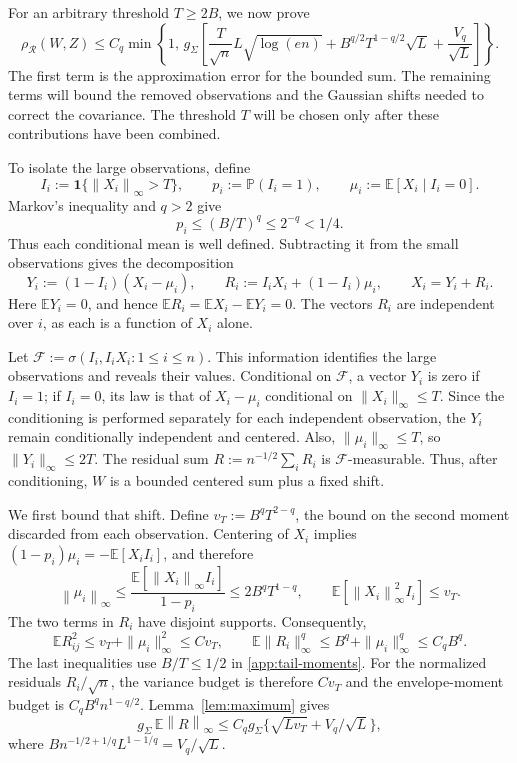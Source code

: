 \documentclass[11pt,letterpaper]{article}
\theoremstyle{remark}
\newcommand{\E}{\mathbb E}
\newcommand{\Pp}{\mathbb P}
\newcommand{\norm}[1]{\left\lVert#1\right\rVert}
\newcommand{\rh}{\rho_{\mathcal R}}
\newcommand{\ind}{\mathbf 1}
\begin{document}
For an arbitrary threshold $T\ge2B$, we now prove
\begin{equation}
 \rh(W,Z)\le C_q\min\left\{1,\,
 g_\Sigma\left[
 \frac{T}{\sqrt n}L\sqrt{\log(en)}
 +B^{q/2}T^{1-q/2}\sqrt L+\frac{V_q}{\sqrt L}\right]\right\}.
 \label{poly:threshold}
\end{equation}
The first term is the approximation error for the bounded sum.
The remaining terms will bound the removed observations and the
Gaussian shifts needed to correct the covariance. The threshold
$T$ will be chosen only after these contributions have been combined.

To isolate the large observations, define
\[
 I_i:=\ind\{\norm{X_i}_\infty>T\},\qquad
 p_i:=\Pp(I_i=1),\qquad \mu_i:=\E[X_i\mid I_i=0].
\]
Markov's inequality and $q>2$ give
\begin{equation}
 p_i\le(B/T)^q\le2^{-q}<1/4.
 \label{app:p_i-bound}
\end{equation}
Thus each conditional mean is well defined. Subtracting it from
the small observations gives the decomposition
\begin{equation}
 Y_i:=(1-I_i)(X_i-\mu_i),\qquad
 R_i:=I_iX_i+(1-I_i)\mu_i,\qquad X_i=Y_i+R_i.
 \label{app:decomposition}
\end{equation}
Here $\E Y_i=0$, and hence $\E R_i=\E X_i-\E Y_i=0$.
The vectors $R_i$ are independent over $i$, as each is a function
of $X_i$ alone.

Let $\mathcal F:=\sigma(I_i,I_iX_i:1\le i\le n)$. This
information identifies the large observations and reveals their
values. Conditional on $\mathcal F$, a vector $Y_i$ is zero if
$I_i=1$; if $I_i=0$, its law is that of $X_i-\mu_i$ conditional
on $\|X_i\|_\infty\le T$. Since the conditioning is performed
separately for each independent observation, the $Y_i$ remain
conditionally independent and centered. Also,
$\|\mu_i\|_\infty\le T$, so $\|Y_i\|_\infty\le2T$.
The residual sum $R:=n^{-1/2}\sum_iR_i$ is
$\mathcal F$-measurable. Thus, after conditioning, $W$ is a
bounded centered sum plus a fixed shift.

We first bound that shift. Define $v_T:=B^qT^{2-q}$, the bound
on the second moment discarded from each observation. Centering
of $X_i$ implies $(1-p_i)\mu_i=-\E[X_iI_i]$, and therefore
\begin{equation}
 \norm{\mu_i}_\infty
 \le\frac{\E[\norm{X_i}_\infty I_i]}{1-p_i}
 \le2B^qT^{1-q},\qquad
 \E[\norm{X_i}_\infty^2 I_i]\le v_T.
 \label{app:tail-moments}
\end{equation}
The two terms in $R_i$ have disjoint supports. Consequently,
\[
 \E R_{ij}^2
 \le v_T+\|\mu_i\|_\infty^2\le Cv_T,
 \qquad
 \E\|R_i\|_\infty^q
 \le B^q+\|\mu_i\|_\infty^q\le C_qB^q.
\]
The last inequalities use $B/T\le1/2$ in
\eqref{app:tail-moments}. For the normalized residuals $R_i/\sqrt n$,
the variance budget is therefore $Cv_T$ and the envelope-moment
budget is $C_qB^qn^{1-q/2}$. Lemma~\ref{lem:maximum} gives
\begin{equation}
 g_\Sigma\,\E\norm R_\infty
 \le C_qg_\Sigma\{\sqrt{Lv_T}+V_q/\sqrt L\},
 \label{app:shift}
\end{equation}
where $Bn^{-1/2+1/q}L^{1-1/q}=V_q/\sqrt L$.
\end{document}

